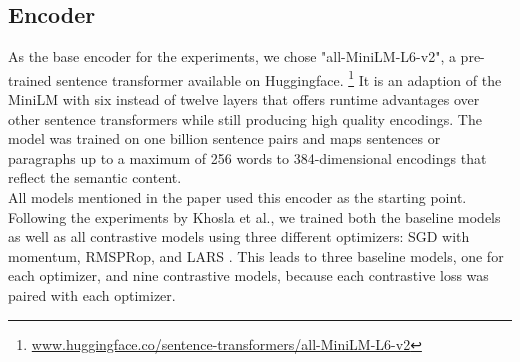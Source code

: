 \documentclass[11pt]{article}
\begin{document}
\subsection{Encoder}
\label{subsec:encoder}
As the base encoder for the experiments, we chose "all-MiniLM-L6-v2", a pre-trained sentence transformer available on Huggingface.%
\footnote{\url{www.huggingface.co/sentence-transformers/all-MiniLM-L6-v2}}
It is an adaption of the MiniLM \cite{wang:2020} with six instead of twelve layers that offers runtime advantages over other sentence transformers while still producing high quality encodings.
The model was trained on one billion sentence pairs and maps sentences or paragraphs up to a maximum of 256 words to 384-dimensional encodings that reflect the semantic content.\\
All models mentioned in the paper used this encoder as the starting point. 
Following the experiments by Khosla et al., we trained both the baseline models as well as all contrastive models using three different optimizers: SGD with momentum, RMSPRop, and LARS \cite{khosla:2020}.
This leads to three baseline models, one for each optimizer, and nine contrastive models, because each contrastive loss was paired with each optimizer.
\end{document}
